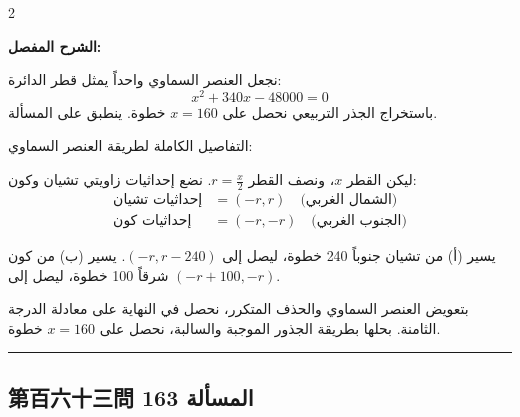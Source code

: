 \documentclass[11pt,a4paper]{article}
\newcommand{\ar}[1]{\arabicfont\beginR #1\endR}
\newcommand{\arb}[1]{\textbf{\arabicfont\beginR #1\endR}}
\newcommand{\longline}{\noindent\rule{\textwidth}{0.4pt}}
\newcommand{\arnote}[1]{\textcolor{arabicblue}{\ar{#1}}}
\newcommand{\arshr}[1]{\par\noindent\arb{الشرح المفصل: }\arnote{#1}\par}
\begin{document}
\begin{paracol}{2}
\begin{rightcolumn}
\arshr{نجعل العنصر السماوي واحداً يمثل قطر الدائرة:
$$x^2 + 340x - 48000 = 0$$
باستخراج الجذر التربيعي نحصل على $x = 160$ خطوة. ينطبق على المسألة.

التفاصيل الكاملة لطريقة العنصر السماوي:

ليكن القطر $x$، ونصف القطر $r = \frac{x}{2}$. نضع إحداثيات زاويتي تشيان وكون:
\begin{align*}
\text{إحداثيات تشيان} &= (-r, r) \quad \text{(الشمال الغربي)} \\
\text{إحداثيات كون} &= (-r, -r) \quad \text{(الجنوب الغربي)}
\end{align*}

يسير (أ) من تشيان جنوباً 240 خطوة، ليصل إلى $(-r, r - 240)$.
يسير (ب) من كون شرقاً 100 خطوة، ليصل إلى $(-r + 100, -r)$.

بتعويض العنصر السماوي والحذف المتكرر، نحصل في النهاية على معادلة الدرجة الثامنة. بحلها بطريقة الجذور الموجبة والسالبة، نحصل على $x = 160$ خطوة.}
\end{rightcolumn}

\end{paracol}

\vspace{0.3cm}
\longline

\subsection*{第百六十三問 \hfill \ar{المسألة 163}}
\end{document}
